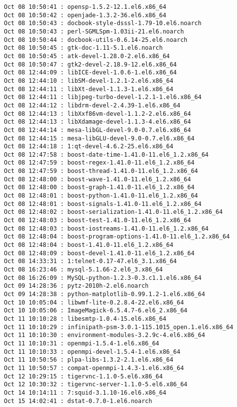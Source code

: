 \documentclass[11pt]{article}
\begin{document}
\begin{verbatim}
Oct 08 10:50:41 : opensp-1.5.2-12.1.el6.x86_64
Oct 08 10:50:42 : openjade-1.3.2-36.el6.x86_64
Oct 08 10:50:43 : docbook-style-dsssl-1.79-10.el6.noarch
Oct 08 10:50:43 : perl-SGMLSpm-1.03ii-21.el6.noarch
Oct 08 10:50:44 : docbook-utils-0.6.14-25.el6.noarch
Oct 08 10:50:45 : gtk-doc-1.11-5.1.el6.noarch
Oct 08 10:50:45 : atk-devel-1.28.0-2.el6.x86_64
Oct 08 10:50:47 : gtk2-devel-2.18.9-12.el6.x86_64
Oct 08 12:44:09 : libICE-devel-1.0.6-1.el6.x86_64
Oct 08 12:44:10 : libSM-devel-1.2.1-2.el6.x86_64
Oct 08 12:44:11 : libXt-devel-1.1.3-1.el6.x86_64
Oct 08 12:44:11 : libjpeg-turbo-devel-1.2.1-1.el6.x86_64
Oct 08 12:44:12 : libdrm-devel-2.4.39-1.el6.x86_64
Oct 08 12:44:13 : libXxf86vm-devel-1.1.2-2.el6.x86_64
Oct 08 12:44:13 : libXdamage-devel-1.1.3-4.el6.x86_64
Oct 08 12:44:14 : mesa-libGL-devel-9.0-0.7.el6.x86_64
Oct 08 12:44:15 : mesa-libGLU-devel-9.0-0.7.el6.x86_64
Oct 08 12:44:18 : 1:qt-devel-4.6.2-25.el6.x86_64
Oct 08 12:47:58 : boost-date-time-1.41.0-11.el6_1.2.x86_64
Oct 08 12:47:59 : boost-regex-1.41.0-11.el6_1.2.x86_64
Oct 08 12:47:59 : boost-thread-1.41.0-11.el6_1.2.x86_64
Oct 08 12:48:00 : boost-wave-1.41.0-11.el6_1.2.x86_64
Oct 08 12:48:00 : boost-graph-1.41.0-11.el6_1.2.x86_64
Oct 08 12:48:01 : boost-python-1.41.0-11.el6_1.2.x86_64
Oct 08 12:48:01 : boost-signals-1.41.0-11.el6_1.2.x86_64
Oct 08 12:48:02 : boost-serialization-1.41.0-11.el6_1.2.x86_64
Oct 08 12:48:03 : boost-test-1.41.0-11.el6_1.2.x86_64
Oct 08 12:48:03 : boost-iostreams-1.41.0-11.el6_1.2.x86_64
Oct 08 12:48:04 : boost-program-options-1.41.0-11.el6_1.2.x86_64
Oct 08 12:48:04 : boost-1.41.0-11.el6_1.2.x86_64
Oct 08 12:48:09 : boost-devel-1.41.0-11.el6_1.2.x86_64
Oct 08 14:33:31 : 1:telnet-0.17-47.el6_3.1.x86_64
Oct 08 16:23:46 : mysql-5.1.66-2.el6_3.x86_64
Oct 08 16:26:09 : MySQL-python-1.2.3-0.3.c1.1.el6.x86_64
Oct 09 14:28:36 : pytz-2010h-2.el6.noarch
Oct 09 14:28:38 : python-matplotlib-0.99.1.2-1.el6.x86_64
Oct 10 10:05:04 : libwmf-lite-0.2.8.4-22.el6.x86_64
Oct 10 10:05:06 : ImageMagick-6.5.4.7-6.el6_2.x86_64
Oct 11 10:10:28 : libesmtp-1.0.4-15.el6.x86_64
Oct 11 10:10:29 : infinipath-psm-3.0.1-115.1015_open.1.el6.x86_64
Oct 11 10:10:30 : environment-modules-3.2.9c-4.el6.x86_64
Oct 11 10:10:31 : openmpi-1.5.4-1.el6.x86_64
Oct 11 10:10:33 : openmpi-devel-1.5.4-1.el6.x86_64
Oct 11 10:50:56 : plpa-libs-1.3.2-2.1.el6.x86_64
Oct 11 10:50:57 : compat-openmpi-1.4.3-1.el6.x86_64
Oct 12 10:29:15 : tigervnc-1.1.0-5.el6.x86_64
Oct 12 10:30:32 : tigervnc-server-1.1.0-5.el6.x86_64
Oct 14 10:14:11 : 7:squid-3.1.10-16.el6.x86_64
Oct 15 14:02:41 : dstat-0.7.0-1.el6.noarch
\end{verbatim}
\end{document}

